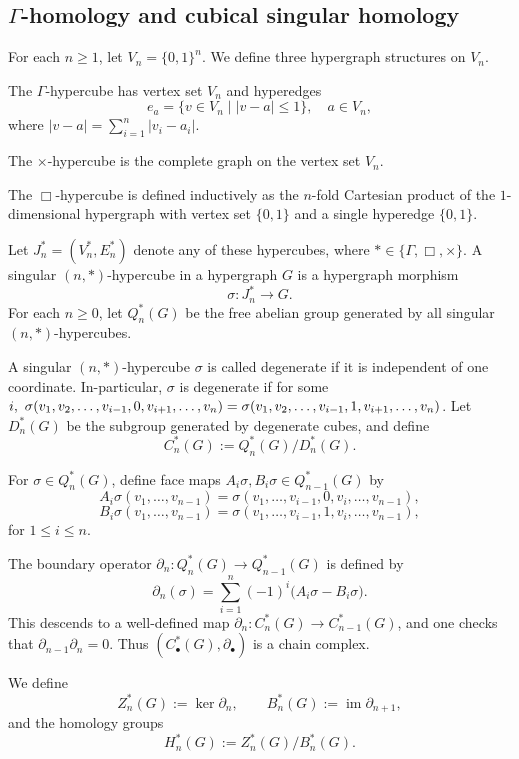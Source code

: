 \documentclass[11pt]{amsart}
\begin{document}
\subsection{$\Gamma$-homology and cubical singular homology}
For each $n \geq 1$, let $V_n = \{0,1\}^n$. We define three hypergraph structures on $V_n$.

The $\Gamma$-hypercube has vertex set $V_n$ and hyperedges
\[
e_a = \{ v \in V_n \mid |v-a| \leq 1 \}, \quad a \in V_n,
\]
where $|v-a| = \sum_{i=1}^n |v_i - a_i|$.

The $\times$-hypercube is the complete graph on the vertex set $V_n$.

The $\Box$-hypercube is defined inductively as the $n$-fold Cartesian product of the $1$-dimensional hypergraph with vertex set $\{0,1\}$ and a single hyperedge $\{0,1\}$.

Let $J_n^*=(V_n^*,E_n^*)$ denote any of these hypercubes, where $* \in \{\Gamma, \Box, \times\}$.
A singular $(n,*)$-hypercube in a hypergraph $G$ is a hypergraph morphism
\[
\sigma \colon J_n^* \to G.
\]
For each $n \geq 0$, let $Q_n^*(G)$ be the free abelian group generated by all singular $(n,*)$-hypercubes.

A singular $(n,*)$-hypercube $\sigma$ is called degenerate if it is independent of one coordinate. In-particular, $\sigma$ is degenerate if for some $i,~\sigma(v_1,v_2,\ldots,v_{i-1},\\ 0,v_{i+1},\ldots,v_n)=\sigma(v_1,v_2,\ldots,v_{i-1},1,v_{i+1},\ldots,v_n)$. Let $D_n^*(G)$ be the subgroup generated by degenerate cubes, and define
\[
C_n^*(G) := Q_n^*(G)/D_n^*(G).
\]

For $\sigma \in Q_n^*(G)$, define face maps $A_i\sigma, B_i\sigma \in Q_{n-1}^*(G)$ by
\[
A_i\sigma(v_1,\dots,v_{n-1}) = \sigma(v_1,\dots,v_{i-1},0,v_i,\dots,v_{n-1}),
\]
\[
B_i\sigma(v_1,\dots,v_{n-1}) = \sigma(v_1,\dots,v_{i-1},1,v_i,\dots,v_{n-1}),
\]
for $1 \leq i \leq n$.

The boundary operator $\partial_n \colon Q_n^*(G) \to Q_{n-1}^*(G)$ is defined by
\[
\partial_n(\sigma) = \sum_{i=1}^n (-1)^i \big(A_i\sigma - B_i\sigma\big).
\]
This descends to a well-defined map $\partial_n \colon C_n^*(G) \to C_{n-1}^*(G)$, and one checks that $\partial_{n-1}\partial_n = 0$. Thus $(C_\bullet^*(G), \partial_\bullet)$ is a chain complex.

We define
\[
Z_n^*(G) := \ker \partial_n, \qquad B_n^*(G) := \operatorname{im} \partial_{n+1},
\]
and the homology groups
\[
H_n^*(G) := Z_n^*(G)/B_n^*(G).
\]
\end{document}

